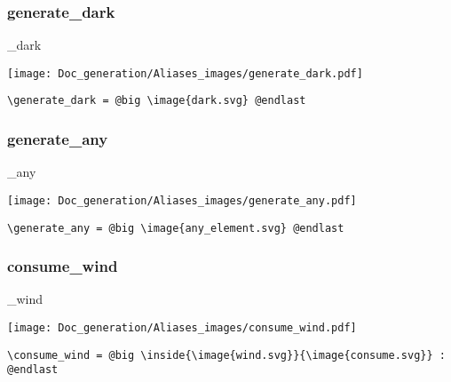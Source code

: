 \documentclass{article}
\begin{document}
\subsubsection{generate\_dark}
\begin{minipage}{0.45\linewidth}
\raggedright
\begin{spverbatim}
\generate_dark
\end{spverbatim}
\end{minipage}
\begin{minipage}{0.45\linewidth}
\raggedleft
\texttt{[image: Doc\_generation/Aliases\_images/generate\_dark.pdf]}
\end{minipage}
\begin{center}
\begin{BVerbatim}
\generate_dark = @big \image{dark.svg} @endlast
\end{BVerbatim}
\end{center}

\subsubsection{generate\_any}
\begin{minipage}{0.45\linewidth}
\raggedright
\begin{spverbatim}
\generate_any
\end{spverbatim}
\end{minipage}
\begin{minipage}{0.45\linewidth}
\raggedleft
\texttt{[image: Doc\_generation/Aliases\_images/generate\_any.pdf]}
\end{minipage}
\begin{center}
\begin{BVerbatim}
\generate_any = @big \image{any_element.svg} @endlast
\end{BVerbatim}
\end{center}

\subsubsection{consume\_wind}
\begin{minipage}{0.45\linewidth}
\raggedright
\begin{spverbatim}
\consume_wind
\end{spverbatim}
\end{minipage}
\begin{minipage}{0.45\linewidth}
\raggedleft
\texttt{[image: Doc\_generation/Aliases\_images/consume\_wind.pdf]}
\end{minipage}
\begin{center}
\begin{BVerbatim}
\consume_wind = @big \inside{\image{wind.svg}}{\image{consume.svg}} : @endlast
\end{BVerbatim}
\end{center}
\end{document}

